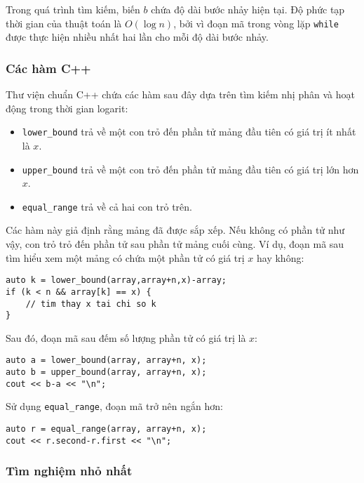 Trong quá trình tìm kiếm, biến $b$
chứa độ dài bước nhảy hiện tại.
Độ phức tạp thời gian của thuật toán là $O(\log n)$,
bởi vì đoạn mã trong vòng lặp \texttt{while}
được thực hiện nhiều nhất hai lần cho mỗi độ dài bước nhảy.

\subsubsection{Các hàm C++}

Thư viện chuẩn C++ chứa các hàm sau đây
dựa trên tìm kiếm nhị phân và hoạt động trong thời gian logarit:

\begin{itemize}
\item \texttt{lower\_bound} trả về một con trỏ đến
phần tử mảng đầu tiên có giá trị ít nhất là $x$.
\item \texttt{upper\_bound} trả về một con trỏ đến
phần tử mảng đầu tiên có giá trị lớn hơn $x$.
\item \texttt{equal\_range} trả về cả hai con trỏ trên.
\end{itemize}

Các hàm này giả định rằng mảng đã được sắp xếp.
Nếu không có phần tử như vậy, con trỏ trỏ đến
phần tử sau phần tử mảng cuối cùng.
Ví dụ, đoạn mã sau tìm hiểu xem
một mảng có chứa một phần tử có giá trị $x$ hay không:

\begin{lstlisting}
auto k = lower_bound(array,array+n,x)-array;
if (k < n && array[k] == x) {
    // tim thay x tai chi so k
}
\end{lstlisting}

Sau đó, đoạn mã sau đếm số lượng phần tử
có giá trị là $x$:

\begin{lstlisting}
auto a = lower_bound(array, array+n, x);
auto b = upper_bound(array, array+n, x);
cout << b-a << "\n";
\end{lstlisting}

Sử dụng \texttt{equal\_range}, đoạn mã trở nên ngắn hơn:

\begin{lstlisting}
auto r = equal_range(array, array+n, x);
cout << r.second-r.first << "\n";
\end{lstlisting}

\subsubsection{Tìm nghiệm nhỏ nhất}

